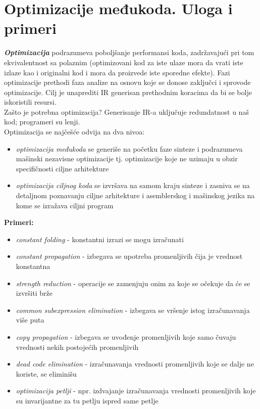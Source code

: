 \documentclass[10pt]{extarticle}
\begin{document}
\section{Optimizacije međukoda. Uloga i primeri}
\noindent
\textit{\textbf{Optimizacija}} podrazumeva poboljšanje performansi koda, zadržavajući pri tom ekvivalentnost sa polaznim (optimizovani kod za iste ulaze mora da vrati iste izlaze kao i originalni kod i mora da proizvede iste sporedne efekte). 
Fazi optimizacije prethodi faza analize na osnovu koje se donose zaključci i sprovode optimizacije. Cilj je unaprediti IR generisan prethodnim koracima da bi se bolje iskoristili resursi. \\
Zašto je potrebna optimizacija? Generisanje IR-a uključuje redundatnost u naš kod; programeri su lenji.\\
Optimizacija se najčešće odvija na dva nivoa:
\begin{itemize}
    \item \textit{optimizacija međukoda} se generiše na početku faze sinteze  i podrazumeva mašinski nezavisne optimizacije tj. optimizacije koje ne uzimaju u obzir specifičnosti ciljne arhitekture
    \item \textit{optimizacija ciljnog koda} se izvršava na samom kraju sinteze i zasniva se na detaljnom poznavanju ciljne arhitekture i asemblerskog i mašinskog jezika na kome se izražava ciljni program
\end{itemize}
\textbf{Primeri:}
\begin{itemize}
    \item \textit{constant folding} - konstantni izrazi se mogu izračunati
    \item \textit{constant propagation} - izbegava se upotreba promenljivih čija je vrednost konstantna
    \item \textit{strength reduction} - operacije se zamenjuju onim za koje se očekuje da će se izvršiti brže
    \item \textit{common subexpression elimination} - izbegava se vršenje istog izračunavanja više puta
    \item \textit{copy propagation} - izbegava se uvođenje promenljivih koje samo čuvaju vrednosti nekih postojećih promenljivih
    \item \textit{dead code elimination} - izračunavanja vrednosti promenljivih koje se dalje ne koriste, se eliminišu
    \item \textit{optimizacija petlji} - npr. izdvajanje izračunavanja vrednosti promenljivih koje su invarijantne za tu petlju ispred same petlje
\end{itemize}
\end{document}
